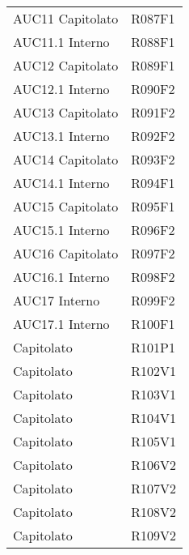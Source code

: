 \documentclass[../analisi-dei-requisiti.tex]{subfiles}
\begin{document}
\begin{longtable}[H]{ p{4cm} | p{4cm} }
  AUC11 Capitolato              & R087F1                               \\
  AUC11.1 Interno               & R088F1                               \\
  AUC12 Capitolato              & R089F1                               \\
  AUC12.1 Interno               & R090F2                               \\
  AUC13 Capitolato              & R091F2                               \\
  AUC13.1 Interno               & R092F2                               \\
  AUC14 Capitolato              & R093F2                               \\
  AUC14.1 Interno               & R094F1                               \\
  AUC15 Capitolato              & R095F1                               \\
  AUC15.1 Interno               & R096F2                               \\
  AUC16 Capitolato              & R097F2                               \\
  AUC16.1 Interno               & R098F2                               \\
  AUC17 Interno                 & R099F2                               \\
  AUC17.1 Interno               & R100F1                               \\
  Capitolato                    & R101P1                               \\
  Capitolato                    & R102V1                               \\
  Capitolato                    & R103V1                               \\
  Capitolato                    & R104V1                               \\
  Capitolato                    & R105V1                               \\
  Capitolato                    & R106V2                               \\
  Capitolato                    & R107V2                               \\
  Capitolato                    & R108V2                               \\
  Capitolato                    & R109V2                               \\

\end{longtable}
\end{document}
